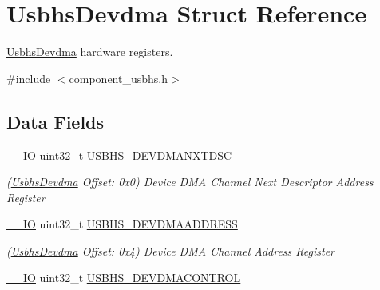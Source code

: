 \hypertarget{structUsbhsDevdma}{}\section{Usbhs\+Devdma Struct Reference}
\label{structUsbhsDevdma}


\mbox{\hyperlink{structUsbhsDevdma}{Usbhs\+Devdma}} hardware registers.  




{\ttfamily \#include $<$component\+\_\+usbhs.\+h$>$}

\subsection*{Data Fields}
\begin{DoxyCompactItemize}
\item 
\mbox{\label{structUsbhsDevdma_acce0e671da825495bf74fb8f9301678f}} 
\mbox{\hyperlink{core__cm7_8h_aec43007d9998a0a0e01faede4133d6be}{\+\_\+\+\_\+\+IO}} uint32\+\_\+t \mbox{\hyperlink{structUsbhsDevdma_acce0e671da825495bf74fb8f9301678f}{U\+S\+B\+H\+S\+\_\+\+D\+E\+V\+D\+M\+A\+N\+X\+T\+D\+SC}}
\begin{DoxyCompactList}\small\item\em (\mbox{\hyperlink{structUsbhsDevdma}{Usbhs\+Devdma}} Offset\+: 0x0) Device D\+MA Channel Next Descriptor Address Register \end{DoxyCompactList}\item 
\mbox{\label{structUsbhsDevdma_a8afd7b98c19ed73eb6ff238c526d8c39}} 
\mbox{\hyperlink{core__cm7_8h_aec43007d9998a0a0e01faede4133d6be}{\+\_\+\+\_\+\+IO}} uint32\+\_\+t \mbox{\hyperlink{structUsbhsDevdma_a8afd7b98c19ed73eb6ff238c526d8c39}{U\+S\+B\+H\+S\+\_\+\+D\+E\+V\+D\+M\+A\+A\+D\+D\+R\+E\+SS}}
\begin{DoxyCompactList}\small\item\em (\mbox{\hyperlink{structUsbhsDevdma}{Usbhs\+Devdma}} Offset\+: 0x4) Device D\+MA Channel Address Register \end{DoxyCompactList}\item 
\mbox{\label{structUsbhsDevdma_a8a7ff4ad5e2f1386f873c004d9ff0f15}} 
\mbox{\hyperlink{core__cm7_8h_aec43007d9998a0a0e01faede4133d6be}{\+\_\+\+\_\+\+IO}} uint32\+\_\+t \mbox{\hyperlink{structUsbhsDevdma_a8a7ff4ad5e2f1386f873c004d9ff0f15}{U\+S\+B\+H\+S\+\_\+\+D\+E\+V\+D\+M\+A\+C\+O\+N\+T\+R\+OL}}

\end{DoxyCompactItemize}

